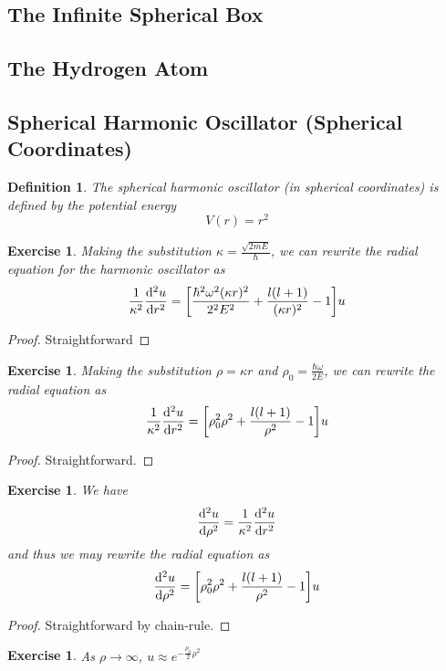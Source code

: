 \documentclass[12pt]{amsart}
\newtheorem{defn}[thm]{Definition}
\newtheorem{ex}[thm]{Exercise}
\newcommand{\om}{\omega}
\newcommand{\kap}{\kappa}
\begin{document}
\subsection{The Infinite Spherical Box}

\subsection{The Hydrogen Atom}


\subsection{Spherical Harmonic Oscillator (Spherical Coordinates)}
\begin{defn}
The spherical harmonic oscillator (in spherical coordinates) is defined by the potential energy
$$V(r) = r^2$$
\end{defn}

\begin{ex}
Making the substitution $\kappa = \frac{\sqrt{2mE}}{\hbar}$, we can rewrite the radial equation for the harmonic oscillator as $$\frac{1}{\kap^2}\dv[2]{u}{r} = \bigg[ \frac{\hbar^2 \om^2 (\kap r)^2}{2^2E^2} + \frac{l(l+1)}{(\kap r)^2} - 1\bigg]u$$
\end{ex}

\begin{proof}
Straightforward
\end{proof}

\begin{ex}
Making the substitution $\rho = \kap r$ and $\rho_0 = \frac{\hbar \om}{2 E}$, we can rewrite the radial equation as $$\frac{1}{\kap^2}\dv[2]{u}{r} = \bigg[ \rho_0^2 \rho^2 + \frac{l(l+1)}{\rho^2} - 1\bigg]u$$
\end{ex}

\begin{proof}
Straightforward.
\end{proof}

\begin{ex}
We have $$\dv[2]{u}{\rho} = \frac{1}{\kap^2}\dv[2]{u}{r}$$ and thus we may rewrite the radial equation as $$\dv[2]{u}{\rho} = \bigg[ \rho_0^2 \rho^2 + \frac{l(l+1)}{\rho^2} - 1\bigg]u$$
\end{ex}

\begin{proof}
Straightforward by chain-rule.
\end{proof}

\begin{ex}
As $ \rho \rightarrow \infty$, $u \approx e^{-\frac{\rho_0}{2}\rho^2}$
\end{ex}
\end{document}
